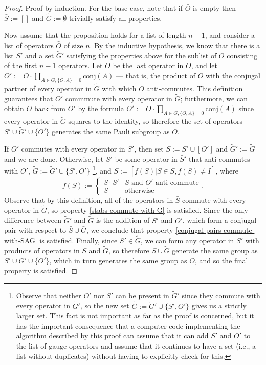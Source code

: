 \documentclass[twocolumn,showpacs,preprintnumbers,amsmath,amssymb,nofootinbib,pra,floatfix]{revtex4}
\newcommand{\lst}{\bar}
\newcommand{\set}{\tilde}
\begin{document}
\begin{proof}
Proof by induction.  For the base case, note that if $\lst O$ is empty then $\lst S := []$ and $\set G:=\emptyset$ trivially satisfy all properties.

Now assume that the proposition holds for a list of length $n-1$, and consider a list of operators $\lst O$ of size $n$.  By the inductive hypothesis, we know that there is a list $\lst S'$ and a set $\set G'$ satisfying the properties above for the sublist of $\lst O$ consisting of the first $n-1$ operators.  Let $O$ be the last operator in $O$, and let $O':=O\cdot \prod_{A\in \set G, \{O,A\}=0} \text{conj}(A)$ --- that is, the product of $O$ with the conjugal partner of every operator in $\set G$ with which $O$ anti-commutes.  This definition guarantees that $O'$ commmute with every operator in $\set G$;  furthermore, we can obtain $O$ back from $O'$ by the formula $O':=O\cdot \prod_{A\in \set G, \{O,A\}=0} \text{conj}(A)$ since every operator in $\set G$ squares to the identity, so therefore the set of operators $\lst S' \cup \set G' \cup \{O'\}$ generates the same Pauli subgroup as $\lst O$.

If $O'$ commutes with every operator in $\lst S'$, then set $\lst S := \lst S' \cup [O']$ and $\set G' := \set G$ and we are done.  Otherwise, let $S'$ be some operator in $\lst S'$ that anti-commutes with $O'$, $\set G:=\set G'\cup \{S',O'\}$
\footnote{Observe that neither $O'$ nor $S'$ can be present in $\set G'$ since they commute with every operator in $\set G'$, so the new set $\set G:=\set G'\cup \{S',O'\}$ gives us a strictly larger set.  This fact is not important as far as the proof is concerned, but it has the important consequence that a computer code implementing the algorithm described by this proof can assume that it can add $S'$ and $O'$ to the list of gauge operators and assume that it continues to have a set (i.e., a list without duplicates) without having to explicitly check for this.}, and $\lst S := [f(S) | S \in \lst S, f(S) \ne I]$, where
$$
f(S) :=
\begin{cases}
S\cdot S' & \text{$S$ and $O'$ anti-commute}\\
S & \text{otherwise}
\end{cases}.
$$
Observe that by this definition, all of the operators in $\lst S$ commute with every operator in $\set G$, so property \ref{stabs-commute-with-G} is satisfied.  Since the only difference between $\set G'$ and $\set G$ is the addition of $S'$ and $O'$, which form a conjugal pair with respect to $\lst S \cup \lst G$, we conclude that property \ref{conjugal-pairs-commute-with-SAG} is satisfied.
Finally, since $S'\in \set G$, we can form any operator in $\lst S'$ with products of operators in $\lst S$ and $\set G$, so therefore $\lst S \cup \set G$ generate the same group as $\lst S' \cup G' \cup \{O'\}$, which in turn generates the same group as $\lst O$, and so the final property is satisfied.
\end{proof}
\end{document}
